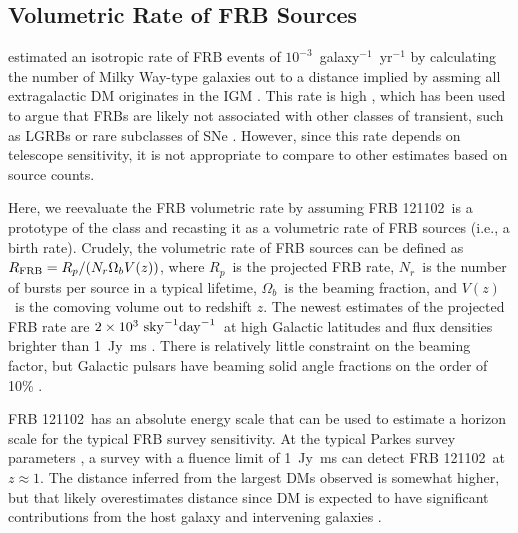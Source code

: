 \documentclass[twocolumn]{aastex61}
\newcommand{\frb}{FRB 121102}
\begin{document}
\subsection{Volumetric Rate of FRB Sources}

\citet{2013Sci...341...53T} estimated an isotropic rate of FRB events of $10^{-3}$\ galaxy$^{-1}$\ yr$^{-1}$ by calculating the number of Milky Way-type galaxies out to a distance implied by assming all extragalactic DM originates in the IGM \citep[$z\approx0.9$\ for DM$\approx z\times900\ \rm{pc}\ \rm{cm}^{-3}$;][]{2003ApJ...598L..79I,2004MNRAS.348..999I}. This rate is high \citep[comparable to the rate of core-collapse supernovae;][]{2006Natur.439...45D}, which has been used to argue that FRBs are likely not associated with other classes of transient, such as LGRBs or rare subclasses of SNe \citep{2006ARA&A..44..507W}. However, since this rate depends on telescope sensitivity, it is not appropriate to compare to other estimates based on source counts.

Here, we reevaluate the FRB volumetric rate by assuming \frb\ is a prototype of the class and recasting it as a volumetric rate of FRB sources (i.e., a birth rate). Crudely, the volumetric rate of FRB sources can be defined as $R_{\rm{FRB}} = R_p /(N_r \Omega_b V (z))$, where $R_p$\ is the projected FRB rate, $N_r$\ is the number of bursts per source in a typical lifetime, $\Omega_b$\ is the beaming fraction, and $V(z)$\ is the comoving volume out to redshift $z$. The newest estimates of the projected FRB rate are $2\times10^3\ \rm{sky}^{-1} \rm{day}^{-1}$\ at high Galactic latitudes and flux densities brighter than 1~Jy~ms \citep{2016arXiv161100458L, 2016MNRAS.460L..30C, 2016MNRAS.455.2207R}. There is relatively little constraint on the beaming factor, but Galactic pulsars have beaming solid angle fractions on the order of 10\% \citep{1998MNRAS.298..625T}.

\frb\ has an absolute energy scale that can be used to estimate a horizon scale for the typical FRB survey sensitivity. At the typical Parkes survey parameters \citep[e.g.,][]{2016MNRAS.460L..30C}, a survey with a fluence limit of 1~Jy~ms can detect \frb\ at $z\approx1$. The distance inferred from the largest DMs observed \citep[$\sim1500$\ pc cm$^{-3}$;][]{2016MNRAS.460L..30C} is somewhat higher, but that likely overestimates distance since DM is expected to have significant contributions from the host galaxy and intervening galaxies \citep{OPT, 2014ApJ...780L..33M}.
\end{document}
